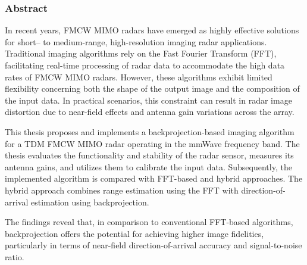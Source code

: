 \subsubsection*{Abstract}
In recent years, FMCW MIMO radars have emerged as highly effective solutions for short-- to medium-range,
high-resolution imaging radar applications. Traditional imaging algorithms rely on the Fast Fourier Transform (FFT),
facilitating real-time processing of radar data to accommodate the high data rates of FMCW MIMO radars.
However, these algorithms exhibit limited flexibility concerning both the shape of the output image and the composition of the input data.
In practical scenarios, this constraint can result in radar image distortion due to near-field effects and antenna gain variations across the array.

This thesis proposes and implements a backprojection-based imaging algorithm for a TDM FMCW MIMO radar operating in the mmWave frequency band.
The thesis evaluates the functionality and stability of the radar sensor, measures its antenna gains, and utilizes them to calibrate the input data.
Subsequently, the implemented algorithm is compared with FFT-based and hybrid approaches.
The hybrid approach combines range estimation using the FFT with direction-of-arrival estimation using backprojection.

The findings reveal that, in comparison to conventional FFT-based algorithms,
backprojection offers the potential for achieving higher image fidelities,
particularly in terms of near-field direction-of-arrival accuracy and signal-to-noise ratio.
